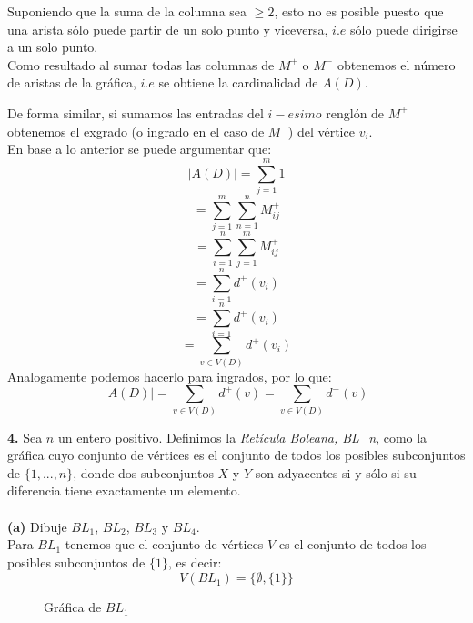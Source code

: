 \documentclass[12pt]{article}
\begin{document}
Suponiendo que la suma de la columna sea $\geq 2$, esto no es posible puesto que una arista sólo puede partir de un solo punto y viceversa, $i.e$ sólo 
puede dirigirse a un solo punto.\\

Como resultado al sumar todas las columnas de $M^+$ o $M^-$ obtenemos el número de aristas de la gráfica, $i.e$ se obtiene la 
cardinalidad de $A(D)$.

De forma similar, si sumamos las entradas del $i-esimo$ renglón de $M^+$ obtenemos el exgrado (o ingrado en el caso de $M^-$) del vértice $v_i$.\\

En base a lo anterior se puede argumentar que:
\[\mid A(D) \mid = \sum\limits_{j = 1}^{m} 1\]
\[= \sum\limits_{j = 1}^{m} \sum\limits_{n = 1}^{n} M^+_{ij}\]
\[= \sum\limits_{i = 1}^{n} \sum\limits_{j = 1}^{m} M^+_{ij}\]
\[= \sum\limits_{i = 1}^{n} d^+(v_i)\]
\[= \sum\limits_{i = 1}^{n} d^+(v_i)\]
\[= \sum_{\displaystyle v \in V(D)} d^+(v_i)\] 
Analogamente podemos hacerlo para ingrados, por lo que:
\[\mid A(D) \mid = \sum_{\displaystyle v \in V(D)} d^+(v) = \sum_{\displaystyle v \in V(D)} d^-(v)\]



\vspace{1cm}
%
%
\textbf{4.} Sea $n$ un entero positivo. Definimos la \textit{Retícula Boleana, BL\_n}, como
la gráfica cuyo conjunto de vértices es el conjunto de todos los posibles subconjuntos
de $\{1, ..., n\}$, donde dos subconjuntos $X$ y $Y$ son adyacentes si y sólo si su diferencia
tiene exactamente un elemento.\\
\\
\textbf{(a)} Dibuje $BL_1$, $BL_2$, $BL_3$ y $BL_4$.
\\

Para $BL_1$ tenemos que el conjunto de vértices $V$ es el conjunto de todos los posibles subconjuntos de $\{1\}$, es decir:
\[V(BL_1) = \{\emptyset, \{1\}\}\]

\begin{figure}[h!]
    \centering
    \begin{minipage}{0.4\textwidth}
        \centering
        \caption{Gráfica de $BL_1$}
    \end{minipage}
\end{figure}
\end{document}
